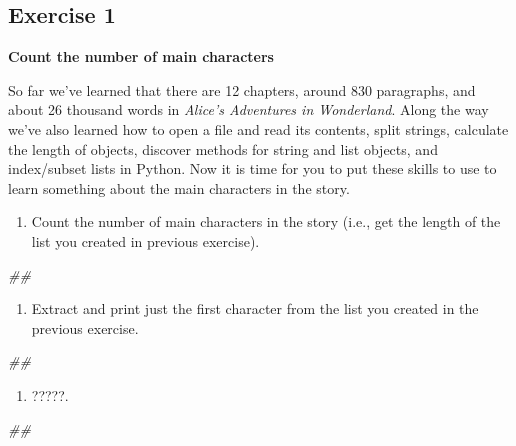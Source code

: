 \documentclass[]{book}
\newenvironment{Shaded}{\begin{snugshade}}{\end{snugshade}}
\newcommand{\CommentTok}[1]{\textcolor[rgb]{0.56,0.35,0.01}{\textit{#1}}}
\providecommand{\tightlist}{%
  \setlength{\itemsep}{0pt}\setlength{\parskip}{0pt}}
\begin{document}
\subsection{Exercise 1}\label{exercise-1-4}

\textbf{Count the number of main characters}

So far we've learned that there are 12 chapters, around 830 paragraphs,
and about 26 thousand words in \emph{Alice's Adventures in Wonderland}.
Along the way we've also learned how to open a file and read its
contents, split strings, calculate the length of objects, discover
methods for string and list objects, and index/subset lists in Python.
Now it is time for you to put these skills to use to learn something
about the main characters in the story.

\begin{enumerate}
\def\labelenumi{\arabic{enumi}.}
\tightlist
\item
  Count the number of main characters in the story (i.e., get the length
  of the list you created in previous exercise).
\end{enumerate}

\begin{Shaded}
\begin{Highlighting}[]
\CommentTok{##}
\end{Highlighting}
\end{Shaded}

\begin{enumerate}
\def\labelenumi{\arabic{enumi}.}
\setcounter{enumi}{1}
\tightlist
\item
  Extract and print just the first character from the list you created
  in the previous exercise.
\end{enumerate}

\begin{Shaded}
\begin{Highlighting}[]
\CommentTok{##}
\end{Highlighting}
\end{Shaded}

\begin{enumerate}
\def\labelenumi{\arabic{enumi}.}
\setcounter{enumi}{2}
\tightlist
\item
  ?????.
\end{enumerate}

\begin{Shaded}
\begin{Highlighting}[]
\CommentTok{##}
\end{Highlighting}
\end{Shaded}
\end{document}
